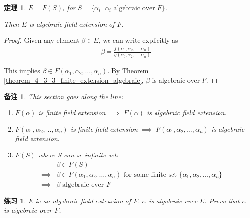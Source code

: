 \documentclass[utf8]{ctexbook}
\newtheorem{theorem}{定理}[section]
\newtheorem{memo}{备注}[section]
\newtheorem{exercise}{练习}[section]
\begin{document}
\begin{theorem}
\label{theorem_4_3_4_extension_algebraic_set}
$E=F(S)$, for $S = \{ \alpha_i \, | \, \alpha_i \mbox{ algebraic over } F \}$.

Then $E$ is algebraic field extension of $F$.
\end{theorem}

\begin{proof}
Given any element $\beta \in E$, we can write explicitly as
\begin{align*}
\beta = \frac{f(\alpha_1, \alpha_2, \ldots, \alpha_n)}{g(\alpha_1, \alpha_2, \ldots, \alpha_n)}
\end{align*}

This implies $\beta \in F(\alpha_1, \alpha_2, \ldots, \alpha_n)$. By Theorem \ref{theorem_4_3_3_finite_extension_algebraic}, $\beta$ is algebraic over $F$.

\end{proof}


\begin{memo}
This section goes along the line:
\begin{enumerate}
\item{$F(\alpha)$ is finite field extension $\implies$ $F(\alpha)$ is algebraic field extension.}
\item{$F(\alpha_1, \alpha_2, \ldots, \alpha_n)$ is finite field extension $\implies$ $F(\alpha_1, \alpha_2, \ldots, \alpha_n)$ is algebraic field extension.}
\item{$F(S)$ where $S$ can be infinite set:
\begin{align*}
& \beta \in F(S) \\
\implies & \beta \in F(\alpha_1, \alpha_2, \ldots, \alpha_n) \mbox{ for some finite set } \{ \alpha_1, \alpha_2, \ldots, \alpha_n \} \\
\implies & \beta \mbox{ algebraic over } F
\end{align*}
}
\end{enumerate}
\end{memo}


\begin{exercise}
$E$ is an algebraic field extension of $F$. $\alpha$ is algebraic over $E$. Prove that $\alpha$ is algebraic over $F$.
\end{exercise}
\end{document}
